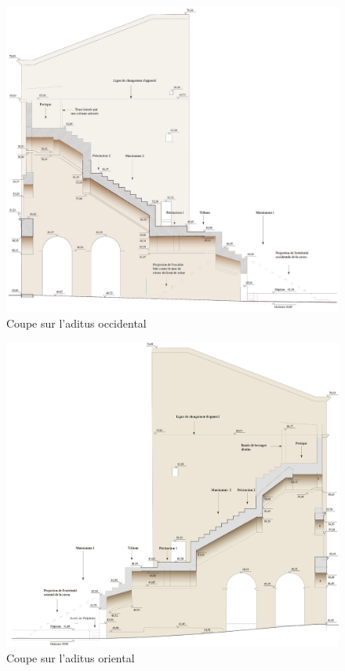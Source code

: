 \begin{figure}[!h]
		\includegraphics[width=\linewidth]{images/aditusOccidental}
		\caption[Coupe sur l'\gls{aditus} occidental]{Coupe sur l'\gls{aditus} occidental \cite[Pl. XLVIII]{orangePl}}
		\label{aditusOccidental}	
\end{figure}

\begin{figure}[!h]
		\includegraphics[width=\linewidth]{images/aditusOriental}
		\caption[Coupe sur l'\gls{aditus} oriental]{Coupe sur l'\gls{aditus} oriental \cite[Pl. XLIX]{orangePl}}
		\label{aditusOriental}
\end{figure}

